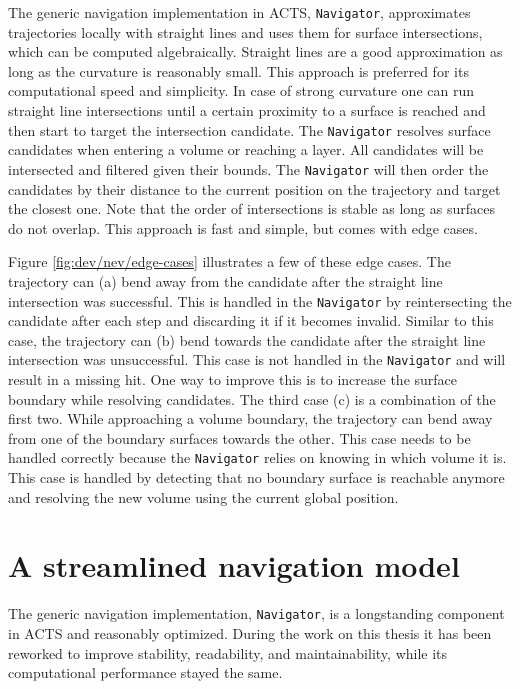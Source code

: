 The generic navigation implementation in ACTS, \texttt{Navigator}, approximates trajectories locally with straight lines and uses them for surface intersections, which can be computed algebraically. Straight lines are a good approximation as long as the curvature is reasonably small. This approach is preferred for its computational speed and simplicity. In case of strong curvature one can run straight line intersections until a certain proximity to a surface is reached and then start to target the intersection candidate. The \texttt{Navigator} resolves surface candidates when entering a volume or reaching a layer. All candidates will be intersected and filtered given their bounds. The \texttt{Navigator} will then order the candidates by their distance to the current position on the trajectory and target the closest one. Note that the order of intersections is stable as long as surfaces do not overlap. This approach is fast and simple, but comes with edge cases.



Figure \ref{fig:dev/nev/edge-cases} illustrates a few of these edge cases. The trajectory can (a) bend away from the candidate after the straight line intersection was successful. This is handled in the \texttt{Navigator} by reintersecting the candidate after each step and discarding it if it becomes invalid. Similar to this case, the trajectory can (b) bend towards the candidate after the straight line intersection was unsuccessful. This case is not handled in the \texttt{Navigator} and will result in a missing hit. One way to improve this is to increase the surface boundary while resolving candidates. The third case (c) is a combination of the first two. While approaching a volume boundary, the trajectory can bend away from one of the boundary surfaces towards the other. This case needs to be handled correctly because the \texttt{Navigator} relies on knowing in which volume it is. This case is handled by detecting that no boundary surface is reachable anymore and resolving the new volume using the current global position.

\section{A streamlined navigation model}

The generic navigation implementation, \texttt{Navigator}, is a longstanding component in ACTS and reasonably optimized. During the work on this thesis it has been reworked to improve stability, readability, and maintainability, while its computational performance stayed the same.

